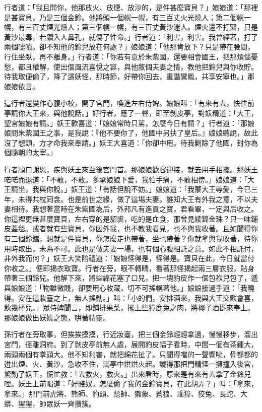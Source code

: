 行者道：「我且問你，他那放火、放煙、放沙的，是件甚麼寶貝？」娘娘道：「那裡是甚寶貝，乃是三個金鈴。他將頭一個幌一幌，有三百丈火光燒人；第二個幌一幌，有三百丈煙光燻人；第三個幌一幌，有三百丈黃沙迷人。煙火還不打緊，只是黃沙最毒，若鑽入人鼻孔，就傷了性命。」行者道：「利害，利害。我曾經著，打了兩個嚏噴。卻不知他的鈴兒放在何處？」娘娘道：「他那肯放下？只是帶在腰間，行住坐臥，再不離身。」行者道：「你若有意於朱紫國，還要相會國王，把那煩惱憂愁，都且權解，使出個風流喜悅之容，與他敘個夫妻之情，教他把鈴兒與你收貯。待我取便偷了，降了這妖怪，那時節，好帶你回去，重諧鸞鳳，共享安寧也。」那娘娘依言。

這行者還變作心腹小校，開了宮門，喚進左右侍婢。娘娘叫：「有來有去，快往前亭請你大王來，與他說話。」好行者，應了一聲，即至剝皮亭，對妖精道：「大王，聖宮娘娘有請。」妖王歡喜道：「娘娘常時只罵，怎麼今日有請？」行者道：「那娘娘問朱紫國王之事，是我說：『他不要你了，他國中另扶了皇后。』娘娘聽說，故此沒了想頭，方才命我來奉請。」妖王大喜道：「你卻中用。待我剿除了他國，封你為個隨朝的太宰。」

行者順口謝恩，疾與妖王來至後宮門首。那娘娘歡容迎接，就去用手相攙。那妖王喏喏而退道：「不敢，不敢。多承娘娘下愛，我怕手痛，不敢相傍。」娘娘道：「大王請坐，我與你說。」妖王道：「有話但說不妨。」娘娘道：「我蒙大王辱愛，今已三年，未得共枕同衾。也是前世之緣，做了這場夫妻。誰知大王有外我之意，不以夫妻相待。我想著當時在朱紫國為后，外邦凡有進貢之寶，君看畢，一定與后收之。你這裡更無甚麼寶貝，左右穿的是貂裘，吃的是血食，那曾見綾錦金珠？只一味鋪皮蓋毯。或者就有些寶貝，你因外我，也不教我看見，也不與我收著。且如聞得你有三個鈴鐺，想就是件寶貝，你怎麼走也帶著，坐也帶著？你就拿與我收著，待你用時取出，未為不可。此也是做夫妻一場，也有個心腹相託之意。如此不相託付，非外我而何？」妖王大笑陪禮道：「娘娘怪得是，怪得是。寶貝在此，今日就當付你收之。」便即揭衣取寶。行者在旁，眼不轉睛，看著那怪揭起兩三層衣服，貼身帶著三個鈴兒。他解下來，將些綿花塞了口兒，把一塊豹皮作一個包袱兒包了，遞與娘娘道：「物雖微賤，卻要用心收藏，切不可搖幌著他。」娘娘接過手道：「我曉得。安在這妝臺之上，無人搖動。」叫：「小的們，安排酒來，我與大王交歡會喜，飲幾杯兒。」眾侍婢聞言，即鋪排果菜，擺上些獐鹿兔之肉，將椰子酒斟來奉上。那娘娘做出妖嬈之態，哄著精靈。

孫行者在旁取事，但挨挨摸摸，行近妝臺，把三個金鈴輕輕拿過，慢慢移步，溜出宮門，徑離洞府。到了剝皮亭前無人處，展開豹皮幅子看時，中間一個有茶鍾大，兩頭兩個有拳頭大。他不知利害，就把綿花扯了。只聞得噹的一聲響喨，骨都都的迸出煙、火、黃沙，急收不住，滿亭中烘烘火起。諕得那把門精怪一擁撞入後宮，驚動了妖王，慌忙教：「去救火，救火。」出來看時，原來是有來有去拿了金鈴兒哩。妖王上前喝道：「好賤奴，怎麼偷了我的金鈴寶貝，在此胡弄？」叫：「拿來，拿來。」那門前虎將、熊師、豹頭、彪帥、獺象、蒼狼、乖獐、狡兔、長蛇、大蟒、猩猩，帥眾妖一齊攢簇。

